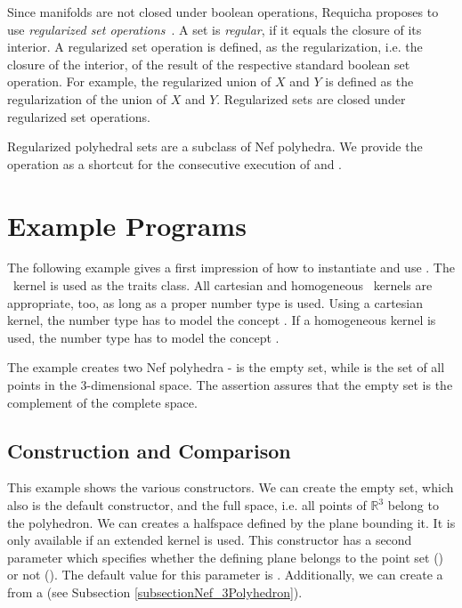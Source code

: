 Since manifolds are not closed under boolean operations, Requicha proposes to 
use \emph{regularized set operations}~\cite{cgal:km-st-76, cgal:r-rrstm-80}. 
A set is 
\emph{regular}, if it equals the closure of its interior. A regularized set 
operation is defined, as the regularization, i.e. the closure of the interior, 
of the result of the respective standard boolean set operation. For example, the 
regularized union of $X$ and $Y$ is defined as the regularization of the union
of $X$ and $Y$. Regularized sets are closed under regularized set operations. 

Regularized polyhedral sets are a subclass of Nef polyhedra. We provide the
operation  as a shortcut for the consecutive execution
of  and .

\section{Example Programs}

The following example gives a first impression of how to instantiate and use
. The \cgal\ kernel  is used as the traits
class. All cartesian and homogeneous \cgal\ kernels are appropriate, too, as 
long as a proper number type is used. Using a cartesian kernel, the number
type has to model the concept . If a homogeneous
kernel is used, the number
type has to model the concept .

The example creates two Nef polyhedra -  is the empty set, while 
 is the set of all points in the 3-dimensional space. The assertion assures
that the empty set is the complement of the complete space.


\subsection{Construction and Comparison}

This example shows the various constructors. We can create the empty set, which
also is the default constructor, and the full space, i.e. all points of
$\mathbb{R}^3$ belong to the polyhedron. We can creates a halfspace
defined by the plane bounding it. It is only available if an extended kernel is
used. This constructor has a second parameter which
specifies whether the defining plane belongs to the point set 
() or not (). The 
default value for this parameter is . Additionally,
we can create a  from a  
(see Subsection \ref{subsectionNef_3Polyhedron}).

